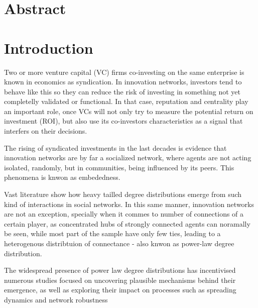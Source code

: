 \section*{Abstract}


\section{Introduction}





Two or more venture capital (VC) firms co-investing on the same enterprise is known in economics as syndication. In innovation networks, investors tend to behave like this so they can reduce the risk of investing in something not yet completelly validated or functional. In that case, reputation and centrality play an important role, once VCs will not only try to measure the potential return on investment (ROI), but also use its co-investors characteristics as a signal that interfers on their decisions.

The rising of syndicated investments in the last decades is evidence that innovation networks are by far a socialized network, where agents are not acting isolated, randomly, but in communities, being influenced by its peers. This phenomena is knwon as embededness.

Vast literature show how heavy tailled degree distributions emerge from such kind of interactions in social networks. In this same manner, innovation networks are not an exception, specially when it commes to number of connections of a certain player, as concentrated hubs of strongly connected agents can noramally be seen, while most part of the sample have only few ties, leading to a heterogenous distribtuion of connectance - also knwon as power-law degree distribution.

The widespread presence of power law degree distributions has incentivised numerous studies focused on uncovering plausible mechanisms behind their emergence, as well as exploring their impact on processes such as spreading dynamics \cite{PastorSatorras2001} and network robustness \cite{Albert2000}


